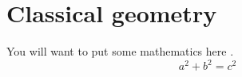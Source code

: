 \documentclass[class=memoir,crop=false]{standalone}
\begin{document}
\chapter{Classical geometry}

You will want to put some mathematics here \cite{texbook}.
\[a^2+b^2=c^2\]

\ifstandalone\fi
\end{document}
